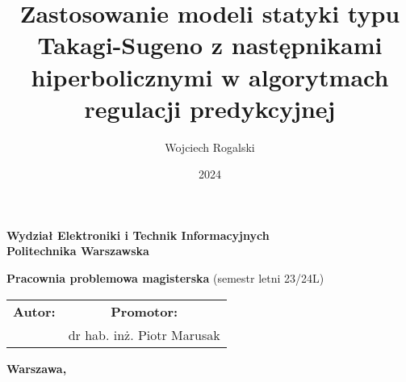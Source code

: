 \documentclass[a4paper,titlepage,11pt,floatssmall]{mwrep}
\begin{document}
\frenchspacing
\pagestyle{uheadings}

\title{\bf Zastosowanie modeli statyki typu Takagi-Sugeno z następnikami hiperbolicznymi w algorytmach regulacji predykcyjnej}
\author{Wojciech Rogalski}
\date{2024}

\makeatletter
\renewcommand{\maketitle}{\begin{titlepage}
\begin{center}{\LARGE {\bf
Wydział Elektroniki i Technik Informacyjnych}}\\
\vspace{0.4cm}
{\LARGE {\bf Politechnika Warszawska}}\\
\vspace{0.3cm}
\end{center}
\vspace{5cm}
\begin{center}
{\bf \LARGE Pracownia problemowa magisterska \vskip 0.1cm}
(semestr letni 23/24L)
\end{center}
\vspace{1cm}
\begin{center}
{\bf \LARGE \@title \vskip 0.1cm}
\end{center}
\vspace{2cm}
\begin{center}
\begin{tabular}{@{}c@{\hspace{2cm}}c@{}}
\bf \Large Autor: & \bf \Large Promotor: \\
\@author & dr hab. inż. Piotr Marusak
\end{tabular}
\end{center}
\vspace*{\stretch{6}}
\begin{center}
\bf{\large{Warszawa, \@date\vskip 0.1cm}}
\end{center}
\end{titlepage}
}
\makeatother
\maketitle
\tableofcontents






\end{document}
